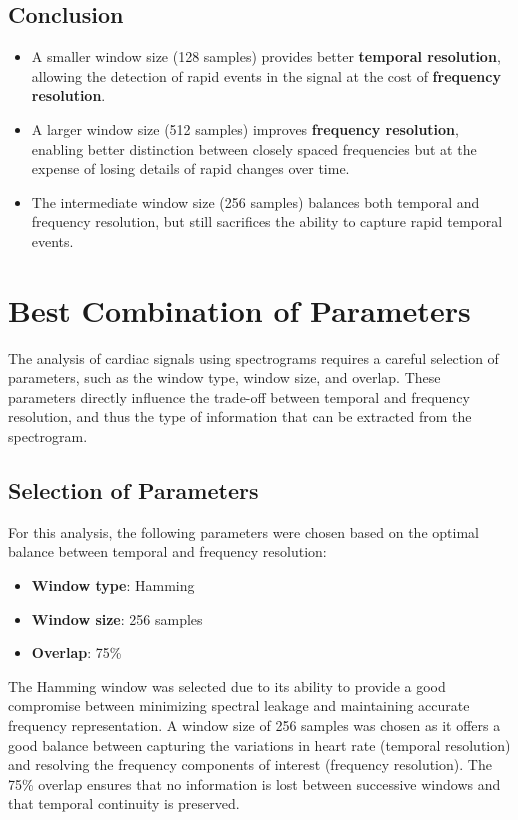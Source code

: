 \documentclass[10pt]{article}
\theoremstyle{definition}
\theoremstyle{remark}
\theoremstyle{definition}
\numberwithin{equation}{prob}
\begin{document}
\subsection*{Conclusion}
\begin{itemize}
    \item A smaller window size (128 samples) provides better \textbf{temporal resolution}, allowing the detection of rapid events in the signal at the cost of \textbf{frequency resolution}.
    \item A larger window size (512 samples) improves \textbf{frequency resolution}, enabling better distinction between closely spaced frequencies but at the expense of losing details of rapid changes over time.
    \item The intermediate window size (256 samples) balances both temporal and frequency resolution, but still sacrifices the ability to capture rapid temporal events.
\end{itemize}


\section{Best Combination of Parameters}

The analysis of cardiac signals using spectrograms requires a careful selection of parameters, such as the window type, window size, and overlap. These parameters directly influence the trade-off between temporal and frequency resolution, and thus the type of information that can be extracted from the spectrogram.

\subsection{Selection of Parameters}

For this analysis, the following parameters were chosen based on the optimal balance between temporal and frequency resolution:

\begin{itemize}
    \item \textbf{Window type}: Hamming
    \item \textbf{Window size}: 256 samples
    \item \textbf{Overlap}: 75\%
\end{itemize}

The Hamming window was selected due to its ability to provide a good compromise between minimizing spectral leakage and maintaining accurate frequency representation. A window size of 256 samples was chosen as it offers a good balance between capturing the variations in heart rate (temporal resolution) and resolving the frequency components of interest (frequency resolution). The 75\% overlap ensures that no information is lost between successive windows and that temporal continuity is preserved.
\end{document}
